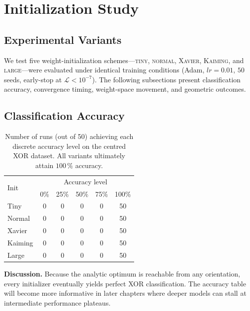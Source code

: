 ﻿%

\section{Initialization Study}
\label{sec:abs1-init}

\subsection*{Experimental Variants}
We test five weight-initialization schemes—\textsc{tiny}, \textsc{normal},
\textsc{Xavier}, \textsc{Kaiming}, and \textsc{large}—were evaluated under
identical training conditions (Adam, $lr=0.01$, $50$ seeds, early-stop at
$\mathcal L<10^{-7}$).  The following subsections present classification
accuracy, convergence timing, weight-space movement, and geometric outcomes.

\subsection*{Classification Accuracy}

\begin{table}[h]
\centering
\caption{Number of runs (out of 50) achieving each discrete accuracy level
on the centred XOR dataset.  All variants ultimately attain $100\,\%$
accuracy.}
\label{tab:abs1-init-accuracy}
\begin{tabular}{lccccc}
\toprule
\multirow{2}{*}{Init} & \multicolumn{5}{c}{Accuracy level}\\
\cmidrule(lr){2-6}
 & 0\% & 25\% & 50\% & 75\% & 100\% \\
\midrule
Tiny    & 0 & 0 & 0 & 0 & 50 \\
Normal  & 0 & 0 & 0 & 0 & 50 \\
Xavier  & 0 & 0 & 0 & 0 & 50 \\
Kaiming & 0 & 0 & 0 & 0 & 50 \\
Large   & 0 & 0 & 0 & 0 & 50 \\
\bottomrule
\end{tabular}
\end{table}

\textbf{Discussion.}  
Because the analytic optimum is reachable from any orientation, every
initializer eventually yields perfect XOR classification.  The accuracy table
will become more informative in later chapters where deeper models can stall
at intermediate performance plateaus.

